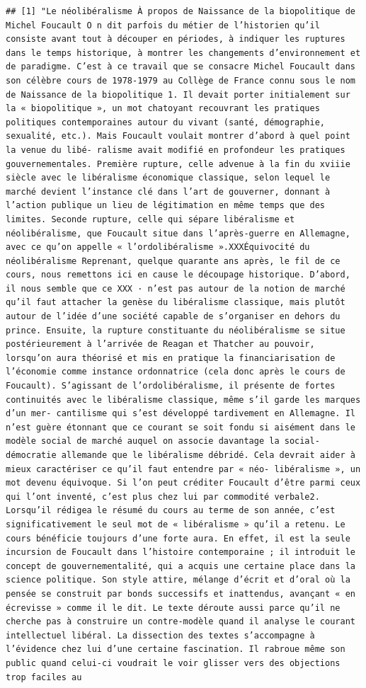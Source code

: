\documentclass[
]{book}
\begin{document}
\begin{verbatim}
## [1] "Le néolibéralisme À propos de Naissance de la biopolitique de Michel Foucault O n dit parfois du métier de l’historien qu’il consiste avant tout à découper en périodes, à indiquer les ruptures dans le temps historique, à montrer les changements d’environnement et de paradigme. C’est à ce travail que se consacre Michel Foucault dans son célèbre cours de 1978-1979 au Collège de France connu sous le nom de Naissance de la biopolitique 1. Il devait porter initialement sur la « biopolitique », un mot chatoyant recouvrant les pratiques politiques contemporaines autour du vivant (santé, démographie, sexualité, etc.). Mais Foucault voulait montrer d’abord à quel point la venue du libé- ralisme avait modifié en profondeur les pratiques gouvernementales. Première rupture, celle advenue à la fin du xviiie siècle avec le libéralisme économique classique, selon lequel le marché devient l’instance clé dans l’art de gouverner, donnant à l’action publique un lieu de légitimation en même temps que des limites. Seconde rupture, celle qui sépare libéralisme et néolibéralisme, que Foucault situe dans l’après-guerre en Allemagne, avec ce qu’on appelle « l’ordolibéralisme ».XXXÉquivocité du néolibéralisme Reprenant, quelque quarante ans après, le fil de ce cours, nous remettons ici en cause le découpage historique. D’abord, il nous semble que ce XXX · n’est pas autour de la notion de marché qu’il faut attacher la genèse du libéralisme classique, mais plutôt autour de l’idée d’une société capable de s’organiser en dehors du prince. Ensuite, la rupture constituante du néolibéralisme se situe postérieurement à l’arrivée de Reagan et Thatcher au pouvoir, lorsqu’on aura théorisé et mis en pratique la financiarisation de l’économie comme instance ordonnatrice (cela donc après le cours de Foucault). S’agissant de l’ordolibéralisme, il présente de fortes continuités avec le libéralisme classique, même s’il garde les marques d’un mer- cantilisme qui s’est développé tardivement en Allemagne. Il n’est guère étonnant que ce courant se soit fondu si aisément dans le modèle social de marché auquel on associe davantage la social-démocratie allemande que le libéralisme débridé. Cela devrait aider à mieux caractériser ce qu’il faut entendre par « néo- libéralisme », un mot devenu équivoque. Si l’on peut créditer Foucault d’être parmi ceux qui l’ont inventé, c’est plus chez lui par commodité verbale2. Lorsqu’il rédigea le résumé du cours au terme de son année, c’est significativement le seul mot de « libéralisme » qu’il a retenu. Le cours bénéficie toujours d’une forte aura. En effet, il est la seule incursion de Foucault dans l’histoire contemporaine ; il introduit le concept de gouvernementalité, qui a acquis une certaine place dans la science politique. Son style attire, mélange d’écrit et d’oral où la pensée se construit par bonds successifs et inattendus, avançant « en écrevisse » comme il le dit. Le texte déroute aussi parce qu’il ne cherche pas à construire un contre-modèle quand il analyse le courant intellectuel libéral. La dissection des textes s’accompagne à l’évidence chez lui d’une certaine fascination. Il rabroue même son public quand celui-ci voudrait le voir glisser vers des objections trop faciles au 
\end{verbatim}
\end{document}
